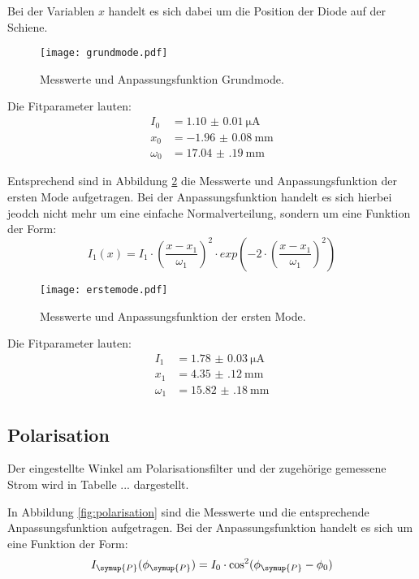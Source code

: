 Bei der Variablen $x$ handelt es sich dabei um die Position der Diode auf der Schiene.

\begin{figure}[H]
  \centering
  \texttt{[image: grundmode.pdf]}
  \caption{Messwerte und Anpassungsfunktion Grundmode.}
  \label{fig:grundmode}
\end{figure}

Die Fitparameter lauten:
\begin{align*}
  I_0 &= \SI{1.10(1)}{\micro\ampere} \\
  x_0 &= \SI{-1.96(8)}{\milli\meter} \\
  \omega_0 &= \SI{17.04(19)}{\milli\meter}
\end{align*}

Entsprechend sind in Abbildung \ref{fig:erstemode} die Messwerte und Anpassungsfunktion
der ersten Mode aufgetragen. Bei der Anpassungsfunktion handelt es sich hierbei jeodch
nicht mehr um eine einfache Normalverteilung, sondern um eine Funktion der Form:
\begin{equation*}
  I_{1}(x) = I_1 \cdot \left(\frac{x - x_1}{\omega_1}\right)^2 \cdot exp\left(-2 \cdot \left(\frac{x - x_1}{\omega_1}\right)^2\right)
\end{equation*}

\begin{figure}[H]
  \centering
  \texttt{[image: erstemode.pdf]}
  \caption{Messwerte und Anpassungsfunktion der ersten Mode.}
  \label{fig:erstemode}
\end{figure}

Die Fitparameter lauten:
\begin{align*}
  I_1 &= \SI{1.78(3)}{\micro\ampere} \\
  x_1 &= \SI{4.35(12)}{\milli\meter} \\
  \omega_1 &= \SI{15.82(18)}{\milli\meter}
\end{align*}

\subsection{Polarisation}
Der eingestellte Winkel am Polarisationsfilter und der zugehörige gemessene Strom
wird in Tabelle ... dargestellt.

In Abbildung \ref{fig:polarisation} sind die Messwerte und die entsprechende
Anpassungsfunktion aufgetragen. Bei der Anpassungsfunktion handelt es sich um eine
Funktion der Form:
\begin{equation*}
  I_\symup{P}(\phi_\symup{P}) = I_0 \cdot \cos^2(\phi_\symup{P} - \phi_0)
\end{equation*}


